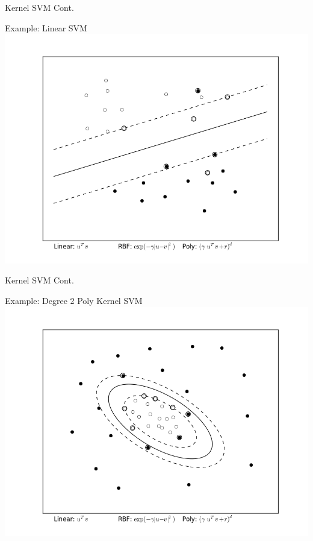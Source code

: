 \documentclass[10pt, compress]{beamer}
\begin{document}
\begin{frame}[fragile]{Kernel SVM Cont.}
  \begin{block}{Example: Linear SVM}
    \includegraphics[width=\textwidth, height=.7\textheight]{images/linear.png}
  \end{block}
\end{frame}

\begin{frame}[fragile]{Kernel SVM Cont.}
  \begin{block}{Example: Degree 2 Poly Kernel SVM}
    \includegraphics[width=\textwidth, height=.7\textheight]{images/quadratic.png}
  \end{block}
\end{frame}
\end{document}
